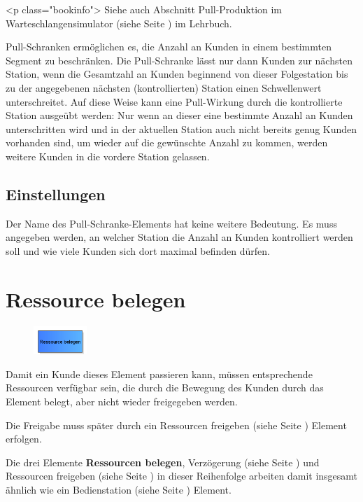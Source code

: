 <p class="bookinfo">
Siehe auch Abschnitt Pull-Produktion im Warteschlangensimulator (siehe Seite \pageref{ref:book:7.6.3}) im Lehrbuch.

Pull-Schranken ermöglichen es, die Anzahl an Kunden in einem bestimmten Segment
zu beschränken. Die Pull-Schranke lässt nur dann Kunden zur nächsten Station,
wenn die Gesamtzahl an Kunden beginnend von dieser Folgestation bis zu der angegebenen
nächsten (kontrollierten) Station einen Schwellenwert unterschreitet. Auf diese Weise
kann eine Pull-Wirkung durch die kontrollierte Station ausgeübt werden: Nur wenn an
dieser eine bestimmte Anzahl an Kunden unterschritten wird und in der aktuellen Station
auch nicht bereits genug Kunden vorhanden sind, um wieder auf die gewünschte Anzahl
zu kommen, werden weitere Kunden in die vordere Station gelassen.

\subsection*{Einstellungen}

Der Name des Pull-Schranke-Elements hat keine weitere Bedeutung. Es muss angegeben
werden, an welcher Station die Anzahl an Kunden kontrolliert werden soll und wie
viele Kunden sich dort maximal befinden dürfen.


\section{Ressource belegen}
\label{ref:ModelElementSeize}

\begin{figure}
\vspace{-22pt}
\includegraphics[width=2cm]{imageModelElementSeize.png}
\vspace{-22pt}
\end{figure}

Damit ein Kunde dieses Element passieren kann, müssen entsprechende Ressourcen verfügbar sein, die durch die Bewegung des
Kunden durch das Element belegt, aber nicht wieder freigegeben werden.

Die Freigabe muss später durch ein Ressourcen freigeben (siehe Seite \pageref{ref:ModelElementRelease}) Element erfolgen.

Die drei Elemente \textbf{Ressourcen belegen}, Verzögerung (siehe Seite \pageref{ref:ModelElementDelay}) und
Ressourcen freigeben (siehe Seite \pageref{ref:ModelElementRelease}) in dieser Reihenfolge arbeiten damit
insgesamt ähnlich wie ein Bedienstation (siehe Seite \pageref{ref:ModelElementProcess}) Element.

